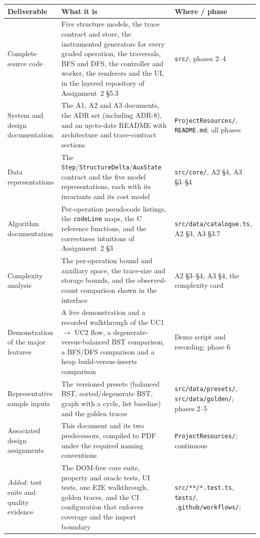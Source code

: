 \documentclass[11pt,a4paper]{article}
\newcommand{\ct}[1]{\texttt{#1}}
\begin{document}
\begin{table}[H]
\centering
\small
\setlength{\tabcolsep}{4pt}
\begin{tabular}{@{}L{3.6cm}L{6.6cm}L{4.2cm}@{}}
\toprule
\textbf{Deliverable} & \textbf{What it is} & \textbf{Where / phase} \\
\midrule
Complete source code & Five structure models, the trace contract and store, the instrumented
generators for every graded operation, the traversals, BFS and DFS, the controller and
worker, the renderers and the UI, in the layered repository of Assignment~2 \S5.3 &
\ct{src/}; phases 2--4 \\
System and design documentation & The A1, A2 and A3 documents, the ADR set (including
ADR-8), and an up-to-date README with architecture and trace-contract sections &
\ct{ProjectResources/}, \ct{README.md}; all phases \\
Data representations & The \ct{Step}/\ct{StructureDelta}/\ct{AuxState} contract and the five
model representations, each with its invariants and its cost model & \ct{src/core/},
A2 \S4, A3 \S3--\S4 \\
Algorithm documentation & Per-operation pseudocode listings, the \ct{codeLine} maps, the C
reference functions, and the correctness intuitions of Assignment~2 \S3 &
\ct{src/data/catalogue.ts}, A2 \S3, A3 \S3.7 \\
Complexity analysis & The per-operation bound and auxiliary space, the trace-size and storage
bounds, and the observed-count comparison shown in the interface & A2 \S3--\S4, A3 \S4,
the complexity card \\
Demonstration of the major features & A live demonstration and a recorded walkthrough of the
UC1 $\to$ UC2 flow, a degenerate-versus-balanced BST comparison, a BFS/DFS comparison and a
heap build-versus-inserts comparison & Demo script and recording; phase 6 \\
Representative sample inputs & The versioned presets (balanced BST, sorted/degenerate BST,
graph with a cycle, list baseline) and the golden traces & \ct{src/data/presets/},
\ct{src/data/golden/}; phases 2--5 \\
Associated design assignments & This document and its two predecessors, compiled to PDF under
the required naming conventions & \ct{ProjectResources/}; continuous \\
\emph{Added:} test suite and quality evidence & The DOM-free core suite, property and oracle
tests, UI tests, one E2E walkthrough, golden traces, and the CI configuration that enforces
coverage and the import boundary & \ct{src/**/*.test.ts}, \ct{tests/}, \ct{.github/workflows/};

\end{tabular}
\end{table}
\end{document}
